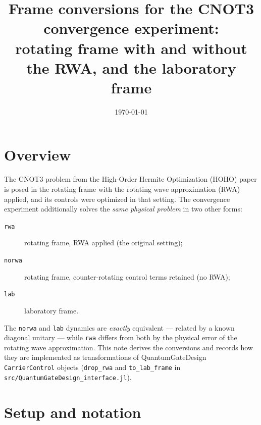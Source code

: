 \documentclass[11pt]{article}
\title{Frame conversions for the CNOT3 convergence experiment:\\
rotating frame with and without the RWA, and the laboratory frame}
\author{}
\date{\today}
\newcommand{\code}[1]{\texttt{#1}}
\begin{document}
\maketitle

\section{Overview}

The CNOT3 problem from the High-Order Hermite Optimization (HOHO) paper is
posed in the rotating frame with the rotating wave approximation (RWA)
applied, and its controls were optimized in that setting.  The convergence
experiment additionally solves the \emph{same physical problem} in two other
forms:
\begin{description}
    \item[\code{rwa}] rotating frame, RWA applied (the original setting);
    \item[\code{norwa}] rotating frame, counter-rotating control terms
        retained (no RWA);
    \item[\code{lab}] laboratory frame.
\end{description}
The \code{norwa} and \code{lab} dynamics are \emph{exactly} equivalent ---
related by a known diagonal unitary --- while \code{rwa} differs from both by
the physical error of the rotating wave approximation.  This note derives the
conversions and records how they are implemented as transformations of
QuantumGateDesign \code{CarrierControl} objects
(\code{drop\_rwa} and \code{to\_lab\_frame} in
\code{src/QuantumGateDesign\_interface.jl}).

\section{Setup and notation}
\end{document}
